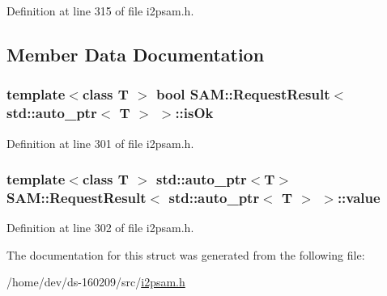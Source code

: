 Definition at line 315 of file i2psam.\+h.



\subsection{Member Data Documentation}
\hypertarget{struct_s_a_m_1_1_request_result_3_01std_1_1auto__ptr_3_01_t_01_4_01_4_a75d4a4a1004ce8263be85753bc2db814}{}
\subsubsection[{is\+Ok}]{\setlength{\rightskip}{0pt plus 5cm}template$<$class T $>$ bool {\bf S\+A\+M\+::\+Request\+Result}$<$ std\+::auto\+\_\+ptr$<$ T $>$ $>$\+::is\+Ok}\label{struct_s_a_m_1_1_request_result_3_01std_1_1auto__ptr_3_01_t_01_4_01_4_a75d4a4a1004ce8263be85753bc2db814}


Definition at line 301 of file i2psam.\+h.

\hypertarget{struct_s_a_m_1_1_request_result_3_01std_1_1auto__ptr_3_01_t_01_4_01_4_a3f70367e769b4a807ddbd522e6fb994d}{}
\subsubsection[{value}]{\setlength{\rightskip}{0pt plus 5cm}template$<$class T $>$ std\+::auto\+\_\+ptr$<$T$>$ {\bf S\+A\+M\+::\+Request\+Result}$<$ std\+::auto\+\_\+ptr$<$ T $>$ $>$\+::value}\label{struct_s_a_m_1_1_request_result_3_01std_1_1auto__ptr_3_01_t_01_4_01_4_a3f70367e769b4a807ddbd522e6fb994d}


Definition at line 302 of file i2psam.\+h.



The documentation for this struct was generated from the following file\+:\begin{DoxyCompactItemize}
\item 
/home/dev/ds-\/160209/src/\hyperlink{i2psam_8h}{i2psam.\+h}\end{DoxyCompactItemize}
